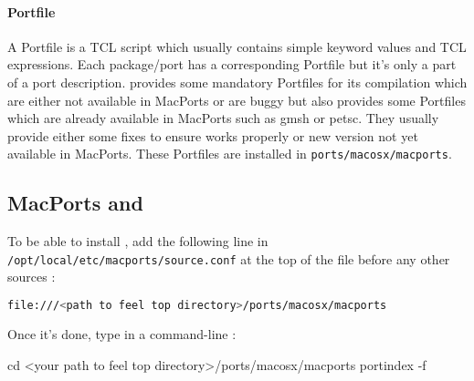 \paragraph{Portfile}
A Portfile is a TCL script which usually contains simple keyword values and TCL
expressions. Each package/port has a corresponding Portfile but it's only a part
of a port description.  \feel provides some mandatory Portfiles for its
compilation which are either not available in MacPorts or are buggy but \feel
also provides some Portfiles which are already available in MacPorts such as
gmsh or petsc. They usually provide either some fixes to ensure \feel works
properly or new version not yet available in MacPorts.  These Portfiles are
installed in \lstinline|ports/macosx/macports|.


\subsection{MacPorts and \Feel}


To be able to install \feel, add the following line in \lstinline|/opt/local/etc/macports/source.conf|
at the top of the file before any other sources :
\begin{lstlisting}[language=sh]
file:///<path to feel top directory>/ports/macosx/macports
\end{lstlisting}

Once it's done, type in a command-line :
\begin{unixcom}
		cd <your path to feel top directory>/ports/macosx/macports
		portindex -f
\end{unixcom}

